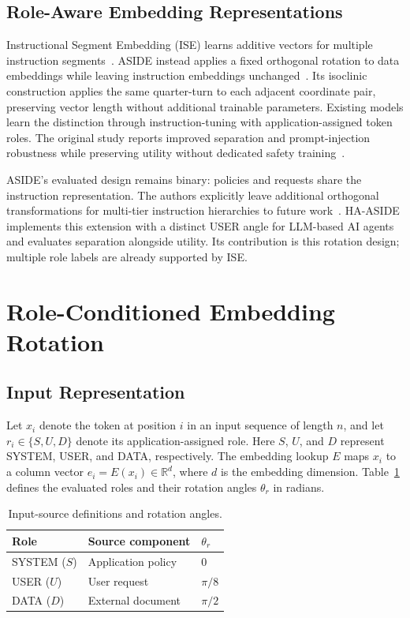 \documentclass[conference,letterpaper,10pt]{IEEEtran}
\begin{document}
\subsection{Role-Aware Embedding Representations}
Instructional Segment Embedding (ISE) learns additive vectors for multiple
instruction segments~\cite{wu2025ise}. ASIDE instead applies a fixed orthogonal rotation
to data embeddings while leaving instruction embeddings
unchanged~\cite{zverev2026aside}. Its isoclinic construction applies the same
quarter-turn to each adjacent coordinate pair, preserving vector length
without additional trainable parameters. Existing models learn the distinction
through instruction-tuning with application-assigned token roles. The original
study reports improved separation and prompt-injection robustness while
preserving utility without dedicated safety training~\cite{zverev2026aside}.

ASIDE's evaluated design remains binary: policies and requests share the
instruction representation. The authors explicitly leave additional orthogonal
transformations for multi-tier instruction hierarchies to future
work~\cite{zverev2026aside}. HA-ASIDE implements this extension with a
distinct USER angle for LLM-based AI agents and evaluates separation alongside
utility. Its contribution is this rotation design; multiple role labels are
already supported by ISE.

\section{Role-Conditioned Embedding Rotation}
\subsection{Input Representation}
Let $x_i$ denote the token at position $i$ in an input sequence of length $n$,
and let $r_i\in\{S,U,D\}$ denote its application-assigned role. Here $S$, $U$,
and $D$ represent SYSTEM, USER, and DATA, respectively. The embedding lookup
$E$ maps $x_i$ to a column vector $e_i=E(x_i)\in\mathbb R^d$, where $d$ is the
embedding dimension. Table~\ref{tab:roles} defines the evaluated roles and
their rotation angles $\theta_r$ in radians.

\begin{table}[t]
\caption{Input-source definitions and rotation angles.}
\label{tab:roles}
\centering
\begin{tabular}{lll}
\hline
Role & Source component & $\theta_r$\\\hline
SYSTEM ($S$) & Application policy & $0$\\
USER ($U$) & User request & $\pi/8$\\
DATA ($D$) & External document & $\pi/2$\\\hline
\end{tabular}
\end{table}
\end{document}
